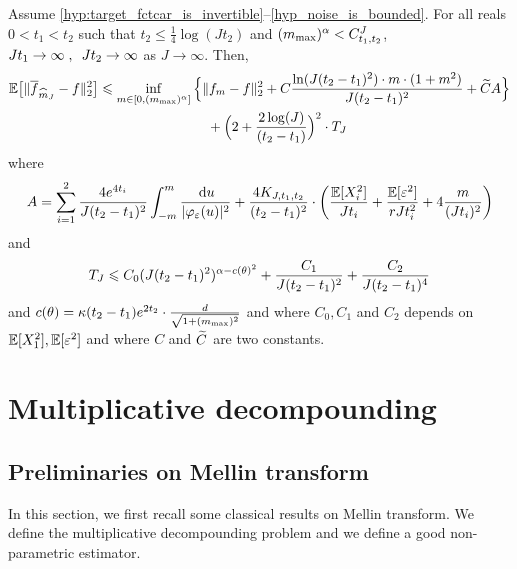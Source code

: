 \begin{theorem} 
Assume \ref{hyp:target_fctcar_is_invertible}--\ref{hyp_noise_is_bounded}. For all reals $0 < t_1 < t_2 $ such that $t_2 \leq \frac{1}{4} \log(J t_2)$ and  $(m_{\max})^\alpha < C^J_{t_1, t_2}$, 
$Jt_1 \to \infty \; , \enspace Jt_2 \to \infty$ as $J \to \infty$. 
Then,
    \begin{align*}
        \mathbb{E} \big[ \lVert\overline f_{\widehat m_J} - f \rVert_2^2 \big] 
        & \leqslant 
        \inf_{m \in [0, (m_{\max})^\alpha]}
        \Big\{
        \lVert f_m - f\rVert_2^2  + C \frac{\ln(J ( t_2 - t_1)^2) \cdot m \cdot(1 + m^2) }{J ( t_2 - t_1)^2} + \widetilde C A 
        \Big\} \\
        & \qquad \qquad \qquad \qquad
        + \Big(2 + \frac{2 \log(J)}{(t_2 - t_1)}\Big)^2 \cdot T_J
    \end{align*}
where 
    \begin{equation*}
        A = \sum_{i = 1}^2 \frac{4 e^{4t_i}}{J (t_2 - t_1)^2} \int_{-m}^{m} \frac{\, \mathrm du}{|\varphi_{\varepsilon}(u)|^2}
		+\frac{4 K_{J, t_1, t_2}}{(t_2 - t_1)^2} 
	 \cdot \bigg( \frac{\mathbb{E}[X_i^2]}{J t_i} 
			+ \frac{\mathbb{E}[\varepsilon^2]}{rJ t_i^2} + 4 \frac{m}{(J t_i)^2} \bigg)
    \end{equation*}
and 
    \begin{equation}
        T_J \leqslant C_0 (J (t_2 -t_1)^2)^{\alpha - c(\theta)^2} + \frac{C_1}{J (t_2 -t_1)^2} + \frac{C_2}{J (t_2 -t_1)^4}
    \end{equation}
and 
 $c(\theta) = \kappa (t_2 - t_1)  e^{2 t_2} \cdot \frac{d}{\sqrt{1 + (m_{\max})^2}}$ and where $C_0, C_1$ and $C_2$ depends on $\mathbb{E}[X_1^2], \mathbb{E}[\varepsilon^2]$ and where $C$ and $\Tilde{C}$ are two constants.
\label{thm:oracle}
\end{theorem}

\section{Multiplicative decompounding}\label{S:multipDecompounding}

\subsection{Preliminaries on Mellin transform} 
\label{sec:mellinDEF}
 In this section, we first recall some classical results on Mellin transform. We define the multiplicative decompounding problem and we define a good non-parametric estimator.  

